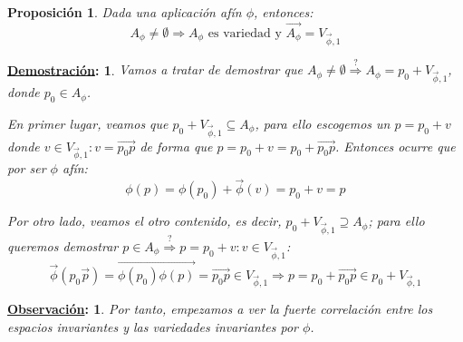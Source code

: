 \documentclass[10pt,a4paper,openright]{book}
\theoremstyle{break}
\newtheorem*{prop}{Proposición}
\newtheorem*{demo}{\underline{Demostración}:}
\newtheorem*{obs}{\underline{Observación}:}
\begin{document}
\begin{prop}
Dada una aplicación afín $\phi$, entonces:
$$A_\phi \neq \emptyset \Rightarrow A_\phi \mbox{ es variedad y } \overrightarrow{A_\phi} = V_{\vec{\phi}, 1}$$
\end{prop}
\begin{demo}
Vamos a tratar de demostrar que $A_\phi \neq \emptyset \overset{?}{\Rightarrow} A_\phi = p_0 + V_{\vec{\phi}, 1} $, donde $p_0 \in A_\phi$.

En primer lugar, veamos que $p_0 + V_{\vec{\phi}, 1}  \subseteq A_\phi$, para ello escogemos un $p= p_0+v$ donde $v\in V_{\vec{\phi}, 1}:  v = \vec{p_0 p}$ de forma que $p = p_0 + v = p_0 + \vec{p_0 p}$. Entonces ocurre que por ser $\phi$ afín:
$$\phi(p) = \phi(p_0)  + \vec{\phi}(v) = p_0 + v = p$$

Por otro lado, veamos el otro contenido, es decir, $p_0 + V_{\vec{\phi}, 1}  \supseteq A_\phi$; para ello queremos demostrar $p \in A_\phi \overset{?}{\Rightarrow}  p = p_0 + v: v \in  V_{\vec{\phi}, 1}$:
$$\vec{\phi}(p_0 \vec{p}) = \overrightarrow{\phi(p_0) \phi(p)} = \vec{p_0 p}  \in V_{\vec{\phi}, 1} \Rightarrow p = p_0 + \vec{p_0 p} \in p_0 + V_{\vec{\phi}, 1} $$
\end{demo}

\begin{obs}
Por tanto, empezamos a ver la fuerte correlación entre los espacios invariantes y las variedades invariantes por $\phi$.
\end{obs}
\end{document}
